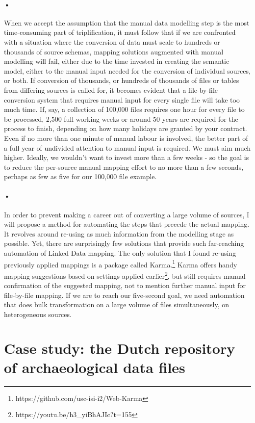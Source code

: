 \documentclass[12pt,twoside,a4paper]{article}
\begin{document}
\paragraph{•}
When we accept the assumption that the manual data modelling step is the most time-consuming part of triplification, it must follow that if we are confronted with a situation where the conversion of data must scale to hundreds or thousands of source schemas, mapping solutions augmented with manual modelling will fail, either due to the time invested in creating the semantic model, either to the manual input needed for the conversion of individual sources, or both. If conversion of thousands, or hundreds of thousands of files or tables from differing sources is called for, it becomes evident that a file-by-file conversion system that requires manual input for every single file will take too much time. If, say, a collection of 100,000 files requires one hour for every file to be processed, 2,500 full working weeks or around 50 years are required for the process to finish, depending on how many holidays are granted by your contract. Even if no more than one minute of manual labour is involved, the better part of a full year of undivided attention to manual input is required. We must aim much higher. Ideally, we wouldn't want to invest more than a few weeks - so the goal is to reduce the per-source manual mapping effort to no more than a few seconds, perhaps as few as five for our 100,000 file example.  
\paragraph{•}
In order to prevent making a career out of converting a large volume of sources, I will propose a method for automating the steps that precede the actual mapping. It revolves around re-using as much information from the modelling stage as possible. Yet, there are surprisingly few solutions that provide such far-reaching automation of Linked Data mapping. The only solution that I found re-using previously applied mappings is a package called Karma.\footnote{https://github.com/usc-isi-i2/Web-Karma} Karma offers handy mapping suggestions based on settings applied earlier\footnote{https://youtu.be/h3\_yiBhAJIc?t=155}, but still requires manual confirmation of the suggested mapping, not to mention further manual input for file-by-file mapping. If we are to reach our five-second goal, we need automation that does bulk transformation on a large volume of files simultaneously, on heterogeneous sources.
\section{Case study: the Dutch repository of archaeological data files}
\end{document}

